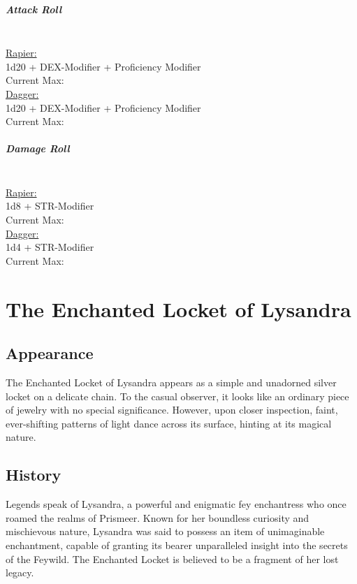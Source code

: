 \documentclass[letterpaper,openany,oneside,twocolumn]{book}
\begin{document}
\paragraph*{Attack Roll}\hfill\\
\underline{Rapier:}\\
1d20 + DEX-Modifier + Proficiency Modifier\\
\indent Current Max: \\
\underline{Dagger:}\\
1d20 + DEX-Modifier + Proficiency Modifier\\
\indent Current Max: 
\paragraph*{Damage Roll}\hfill\\
\underline{Rapier:}\\
1d8 + STR-Modifier\\
\indent Current Max: \\
\underline{Dagger:}\\
1d4 + STR-Modifier\\
\indent Current Max: 

\newpage
\chapter*{The Enchanted Locket of Lysandra}
\section*{Appearance}
The Enchanted Locket of Lysandra appears as a simple and unadorned silver locket on a delicate chain. To the casual observer, it looks like an ordinary piece of jewelry with no special significance. However, upon closer inspection, faint, ever-shifting patterns of light dance across its surface, hinting at its magical nature.
\section*{History}
Legends speak of Lysandra, a powerful and enigmatic fey enchantress who once roamed the realms of Prismeer. Known for her boundless curiosity and mischievous nature, Lysandra was said to possess an item of unimaginable enchantment, capable of granting its bearer unparalleled insight into the secrets of the Feywild. The Enchanted Locket is believed to be a fragment of her lost legacy.
\end{document}
